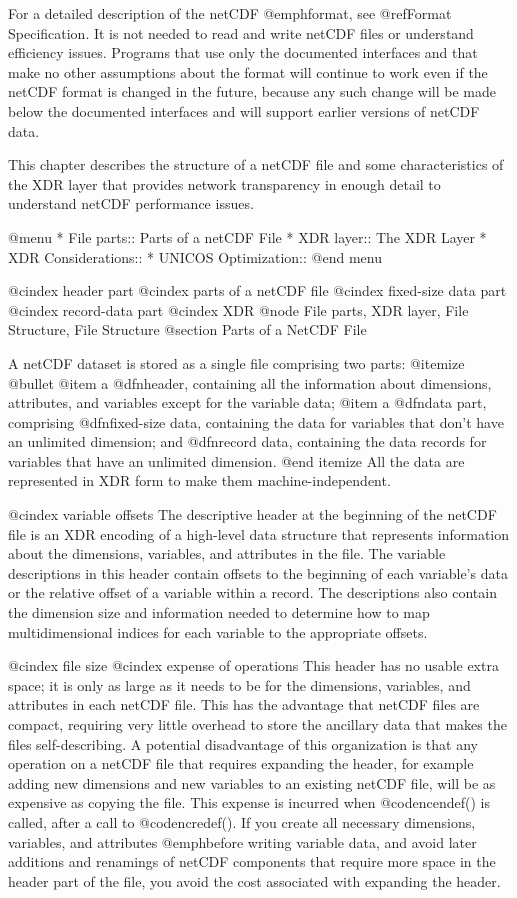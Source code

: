 {For a detailed description of the netCDF @emph{format}, see
@ref{Format Specification}.
It is not needed to read and
write netCDF files or understand efficiency issues.  Programs that use
only the documented interfaces and that make no other assumptions about
the format will continue to work even if the netCDF format is changed in
the future, because any such change will be made below the documented
interfaces and will support earlier versions of netCDF data.

This chapter describes the structure of a netCDF file and some
characteristics of the XDR layer that provides network transparency in
enough detail to understand netCDF performance issues.

@menu
* File parts::                  Parts of a netCDF File
* XDR layer::                   The XDR Layer
* XDR Considerations::
* UNICOS Optimization::
@end menu

@cindex header part
@cindex parts of a netCDF file
@cindex fixed-size data part
@cindex record-data part
@cindex XDR
@node File parts, XDR layer, File Structure, File Structure
@section Parts of a NetCDF File

A netCDF dataset is stored as a single file comprising two parts:
@itemize @bullet
@item
a @dfn{header}, containing all the information about dimensions,
attributes, and variables except for the variable data;
@item
a @dfn{data} part, comprising
@dfn{fixed-size data}, containing the data for variables that
don't have an unlimited dimension; and
@dfn{record data}, containing the data records for variables that
have an unlimited dimension.
@end itemize
All the data are represented in XDR form to make them machine-independent.

@cindex variable offsets
The descriptive header at the beginning of the netCDF file is an XDR
encoding of a high-level data structure that represents information
about the dimensions, variables, and attributes in the file.  The
variable descriptions in this header contain offsets to the beginning of
each variable's data or the relative offset of a variable within a
record. The descriptions also contain the dimension size and information
needed to determine how to map multidimensional indices for each
variable to the appropriate offsets.

@cindex file size
@cindex expense of operations
This header has no usable extra space; it is only as large as it needs
to be for the dimensions, variables, and attributes in each netCDF file.
This has the advantage that netCDF files are compact, requiring very
little overhead to store the ancillary data that makes the files
self-describing.  A potential disadvantage of this organization is
that any operation on a netCDF file that requires expanding the header,
for example adding new dimensions and new variables to an
existing netCDF file, will be as expensive as copying the file.  This
expense is incurred when @code{ncendef()} is called, after a call to
@code{ncredef()}.  If you create all necessary dimensions, variables,
and attributes @emph{before} writing variable data, and avoid later
additions and renamings of netCDF components that require more space in
the header part of the file, you avoid the cost associated with
expanding the header.

}
